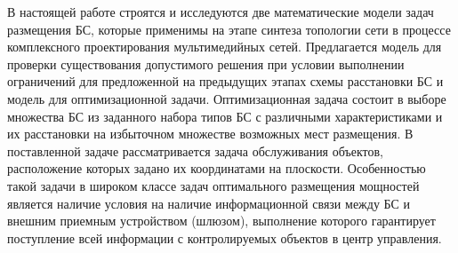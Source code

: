 
В настоящей работе строятся и исследуются две математические модели задач размещения БС, которые применимы на этапе синтеза топологии сети в процессе комплексного проектирования мультимедийных сетей. Предлагается модель для проверки существования допустимого решения при условии выполнении ограничений для предложенной на предыдущих этапах схемы расстановки БС и модель для оптимизационной задачи. Оптимизационная задача состоит в выборе множества БС из заданного набора типов БС с различными характеристиками и их расстановки на избыточном множестве возможных мест размещения. В поставленной задаче рассматривается задача обслуживания объектов, расположение которых задано их координатами на плоскости. Особенностью такой задачи в широком классе задач оптимального размещения мощностей является наличие условия на наличие информационной связи между БС и внешним приемным устройством (шлюзом), выполнение которого гарантирует поступление всей информации с контролируемых объектов в центр управления. 



